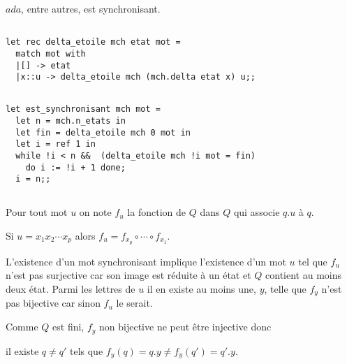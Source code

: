 \subsection{}
$ada$, entre autres, est synchronisant.
\subsection{}
\begin{lstlisting}
let rec delta_etoile mch etat mot =
  match mot with
  |[] -> etat
  |x::u -> delta_etoile mch (mch.delta etat x) u;;
\end{lstlisting}
\subsection{}
\begin{lstlisting}
let est_synchronisant mch mot =
  let n = mch.n_etats in  
  let fin = delta_etoile mch 0 mot in
  let i = ref 1 in
  while !i < n &&  (delta_etoile mch !i mot = fin)
    do i := !i + 1 done;
  i = n;;
\end{lstlisting}
\subsection{}
Pour tout mot $u$ on note $f_u$ la fonction de $Q$ dans $Q$ qui associe $q.u$ à $q$.

Si $u = x_1x_2\cdots x_p$ alors $f_u = f_{x_p}\circ \cdots \circ f_{x_1}$.
 
L'existence d'un mot synchronisant implique l'existence d'un mot $u$ tel que $f_u$ n'est pas surjective car son image est réduite à un état et $Q$ contient au moins deux état. Parmi les lettres de $u$ il en existe au moins une, $y$, telle que $f_y$ n'est pas bijective car sinon $f_u$ le serait.

Comme $Q$ est fini, $f_y$ non bijective ne peut être injective donc 

il existe $q\ne q'$ tels que $f_y(q)=q.y \ne f_y(q') = q'.y$.

